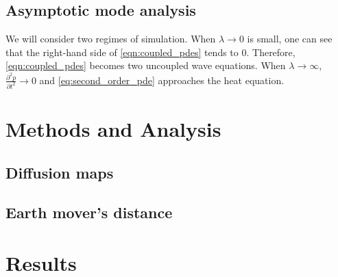 \documentclass[12pt]{article}
\begin{document}
\subsection{Asymptotic mode analysis}  \label{subsec:mode_analysis}

We will consider two regimes of simulation.
%
When $\lambda \rightarrow 0$ is small, one can see that the right-hand side of \eqref{eqn:coupled_pdes} tends to 0. 
%
Therefore, \eqref{eqn:coupled_pdes} becomes two uncoupled wave equations.
%
When $\lambda \rightarrow \infty$, $\frac{\partial^2 p}{\partial t^2} \rightarrow 0$ and \eqref{eq:second_order_pde} approaches the heat equation. 
 
\section{Methods and Analysis}

\subsection{Diffusion maps}

\subsection{Earth mover's distance}

\section{Results}
\end{document}
